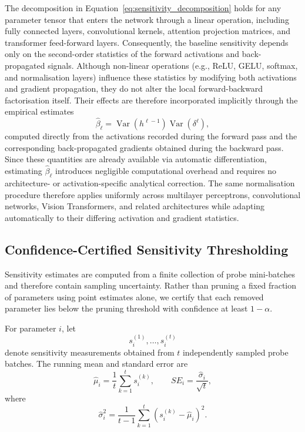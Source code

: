 \documentclass{article}
\theoremstyle{definition}
\theoremstyle{remark}
\begin{document}
The decomposition in Equation~\ref{eq:sensitivity_decomposition} holds for any parameter tensor that enters the network through a linear operation, including fully connected layers, convolutional kernels, attention projection matrices, and transformer feed-forward layers. Consequently, the baseline sensitivity depends only on the second-order statistics of the forward activations and back-propagated signals. Although non-linear operations (e.g., ReLU, GELU, softmax, and normalisation layers) influence these statistics by modifying both activations and gradient propagation, they do not alter the local forward-backward factorisation itself. Their effects are therefore incorporated implicitly through the empirical estimates
\begin{equation}
\widehat{\beta}_{\ell}
=
\operatorname{Var}(h^{\ell-1})
\operatorname{Var}(\delta^{\ell}),
\end{equation}
computed directly from the activations recorded during the forward pass and the corresponding back-propagated gradients obtained during the backward pass. Since these quantities are already available via automatic differentiation, estimating $\widehat{\beta}_{\ell}$ introduces negligible computational overhead and requires no architecture- or activation-specific analytical correction. The same normalisation procedure therefore applies uniformly across multilayer perceptrons, convolutional networks, Vision Transformers, and related architectures while adapting automatically to their differing activation and gradient statistics.

\subsection{Confidence-Certified Sensitivity Thresholding}
\label{subsec:certified}

Sensitivity estimates are computed from a finite collection of probe mini-batches and therefore contain sampling uncertainty. Rather than pruning a fixed fraction of parameters using point estimates alone, we certify that each removed parameter lies below the pruning threshold with confidence at least $1-\alpha$.

For parameter $i$, let
\[
s_i^{(1)}, \ldots, s_i^{(t)}
\]
denote sensitivity measurements obtained from $t$ independently sampled probe batches. The running mean and standard error are
\[
\hat{\mu}_i
=
\frac{1}{t}\sum_{k=1}^{t} s_i^{(k)},
\qquad
SE_i
=
\frac{\hat{\sigma}_i}{\sqrt{t}},
\]
where
\[
\hat{\sigma}_i^2
=
\frac{1}{t-1}
\sum_{k=1}^{t}
\left(s_i^{(k)}-\hat{\mu}_i\right)^2.
\]
\end{document}
